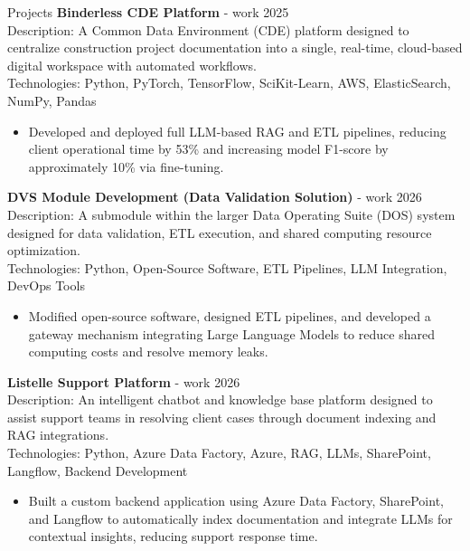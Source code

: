 \documentclass{resume}
\begin{document}
\begin{rSection}{Projects}
\noindent \textbf{Binderless CDE Platform} - work \hfill 2025 \\
Description: A Common Data Environment (CDE) platform designed to centralize construction project documentation into a single, real-time, cloud-based digital workspace with automated workflows. \\
Technologies: Python, PyTorch, TensorFlow, SciKit-Learn, AWS, ElasticSearch, NumPy, Pandas
\begin{itemize}[leftmargin=*,labelsep=0.5em,itemsep=-0.5em,topsep=0pt]
    \item Developed and deployed full LLM-based RAG and ETL pipelines, reducing client operational time by 53\% and increasing model F1-score by approximately 10\% via fine-tuning.
\end{itemize}

\noindent \textbf{DVS Module Development (Data Validation Solution)} - work \hfill 2026 \\
Description: A submodule within the larger Data Operating Suite (DOS) system designed for data validation, ETL execution, and shared computing resource optimization. \\
Technologies: Python, Open-Source Software, ETL Pipelines, LLM Integration, DevOps Tools
\begin{itemize}[leftmargin=*,labelsep=0.5em,itemsep=-0.5em,topsep=0pt]
    \item Modified open-source software, designed ETL pipelines, and developed a gateway mechanism integrating Large Language Models to reduce shared computing costs and resolve memory leaks.
\end{itemize}

\noindent \textbf{Listelle Support Platform} - work \hfill 2026 \\
Description: An intelligent chatbot and knowledge base platform designed to assist support teams in resolving client cases through document indexing and RAG integrations. \\
Technologies: Python, Azure Data Factory, Azure, RAG, LLMs, SharePoint, Langflow, Backend Development
\begin{itemize}[leftmargin=*,labelsep=0.5em,itemsep=-0.5em,topsep=0pt]
    \item Built a custom backend application using Azure Data Factory, SharePoint, and Langflow to automatically index documentation and integrate LLMs for contextual insights, reducing support response time.
\end{itemize}


\end{rSection}
\end{document}
